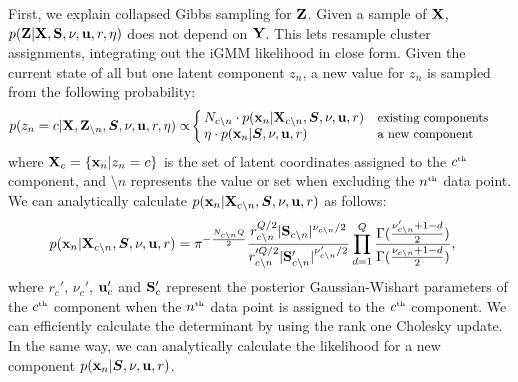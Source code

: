 First, we explain collapsed Gibbs sampling for $\mathbf{Z}$.
Given a sample of $\mathbf{X}$, $p(\mathbf{Z}|\mathbf{X},\mathbf{S},\nu,{\bf{u}},r,\eta)$ does not depend on $\mathbf{Y}$.  This lets resample cluster assignments, integrating out the iGMM likelihood in close form.
Given the current state of all but one latent component $z_{n}$, a new value for $z_{n}$ is sampled from the following probability:
\begin{align}
p(z_{n}=c|\mathbf{X},\mathbf{Z}_{\setminus n},\bm{S},\nu,{\bf{u}},r,\eta)
 & \propto\!
\left\{
\begin{array}{ll}
\!\!N_{c\setminus n}\cdot p({\bf{x}}_{n}|\mathbf{X}_{c\setminus n},\bm{S},\nu,{\bf{u}},r) & \text{{\small existing components}}\\
\!\!\eta\cdot p({\bf{x}}_{n}|\bm{S},\nu,{\bf{u}},r) & \text{{\small a new component}}
\end{array}
\right.
\label{eq:gibbs}
\end{align}
where $\mathbf{X}_{c}=\{{\bf{x}}_{n}|z_{n}=c\}$ 
is the set of latent coordinates assigned to the $c^{\text{\tiny th}}$ component,
and $\setminus n$ represents the value or set
when excluding the $n^{\text{\tiny th}}$ data point.
We can analytically calculate $p({\bf{x}}_{n}|\mathbf{X}_{c\setminus n},\bm{S},\nu,{\bf{u}},r)$
as follows:
\begin{align}
p({\bf{x}}_{n}|\mathbf{X}_{c\setminus n},\bm{S},\nu,{\bf{u}},r)
 & =\pi^{-\frac{N_{c\setminus n}Q}{2}}\frac{r_{c\setminus n}^{Q/2}|\mathbf{S}_{c\setminus n}|^{\nu_{c\setminus n}/2}}{r_{c\setminus n}'^{Q/2}|\mathbf{S}_{c\setminus n}'|^{\nu_{c\setminus n}'/2}}\prod_{d=1}^{Q}\frac{\Gamma(\frac{\nu_{c\setminus n}'+1-d}{2})}{\Gamma(\frac{\nu_{c\setminus n}+1-d}{2})},
\end{align}
where 
$r_{c}'$, $\nu_{c}'$, ${\bf{u}}_{c}'$ and $\mathbf{S}_{c}'$
represent the posterior Gaussian-Wishart parameters of the $c^{\text{\tiny th}}$ component
when the $n^{\text{\tiny th}}$ data point is assigned to the $c^{\text{\tiny th}}$ component.
We can efficiently calculate the determinant by using the
rank one Cholesky update.
In the same way, we can analytically calculate 
the likelihood for a new component $p({\bf{x}}_{n}|\bm{S},\nu,{\bf{u}},r)$.


